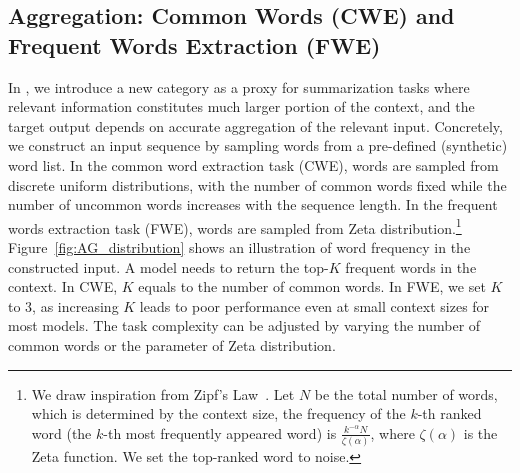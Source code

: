 \subsection{Aggregation: Common Words (CWE) and Frequent Words Extraction (FWE)}
In , we introduce a new category as a  proxy for summarization tasks where relevant information constitutes much larger portion of the context, and the target output depends on accurate aggregation of the relevant input.
Concretely, we construct an input sequence by sampling words from a pre-defined (synthetic) word list. In the common word extraction task (CWE), words are sampled from discrete uniform distributions, with the number of common words fixed while the number of uncommon words increases with the sequence length. In the frequent words extraction task (FWE), words are sampled from Zeta distribution.\footnote{We draw inspiration from Zipf's Law~\citep{zipfslaw}. Let $N$ be the total number of words, which is determined by the context size, the frequency of the $k$-th ranked word (the $k$-th most frequently appeared word) is $\frac{k^{-\alpha}N}{\zeta(\alpha)}$, where $\zeta(\alpha)$ is the Zeta function. We set the top-ranked word to noise.} Figure~\ref{fig:AG_distribution} shows an illustration of word frequency in the constructed input. A model needs to return the top-$K$ frequent words in the context. In CWE, $K$ equals to the number of common words. In FWE, we set $K$ to 3, as increasing $K$ leads to poor performance even at small context sizes for most models.  The task complexity can be adjusted by varying the number of common words or the parameter of Zeta distribution. 



